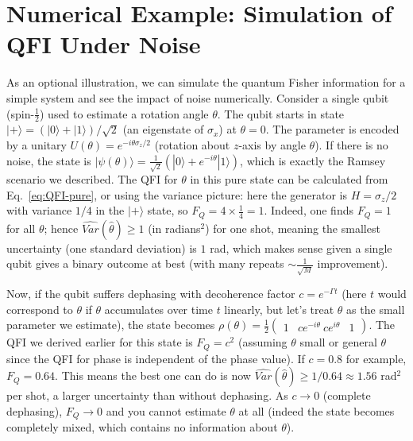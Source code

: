 \section{Numerical Example: Simulation of QFI Under Noise}

\label{sec:numerics}



As an optional illustration, we can simulate the quantum Fisher
information for a simple system and see the impact of noise
numerically. Consider a single qubit (spin-$\frac{1}{2}$) used to
estimate a rotation angle $\theta$. The qubit starts in state
$|+\rangle = (|0\rangle+|1\rangle)/\sqrt{2}$ (an eigenstate of
$\sigma_x$) at $\theta=0$. The parameter is encoded by a unitary
$U(\theta) = e^{-i \theta \sigma_z/2}$ (rotation about $z$-axis by
angle $\theta$). If there is no noise, the state is
$|\psi(\theta)\rangle = \frac{1}{\sqrt{2}}(|0\rangle +
e^{-i\theta}|1\rangle)$, which is exactly the Ramsey scenario we
described. The QFI for $\theta$ in this pure state can be calculated
from Eq.~\eqref{eq:QFI-pure}, or using the variance picture: here the
generator is $H=\sigma_z/2$ with variance $1/4$ in the $|+\rangle$
state, so $F_Q = 4 \times \frac{1}{4} = 1$. Indeed, one finds $F_Q =
1$ for all $\theta$; hence $\widehat{Var}(\hat{\theta}) \ge 1$ (in radians$^2$)
for one shot, meaning the smallest uncertainty (one standard
deviation) is $1$ rad, which makes sense given a single qubit gives a
binary outcome at best (with many repeats $\sim \frac{1}{\sqrt{M}}$
improvement).



Now, if the qubit suffers dephasing with decoherence factor $c =
e^{-\Gamma t}$ (here $t$ would correspond to $\theta$ if $\theta$
accumulates over time $t$ linearly, but let’s treat $\theta$ as the
small parameter we estimate), the state becomes $\rho(\theta) =
\frac{1}{2}\begin{pmatrix}1 & c e^{-i\theta} \ c e^{i\theta} &
  1\end{pmatrix}$. The QFI we derived earlier for this state is $F_Q =
  c^2$ (assuming $\theta$ small or general $\theta$ since the QFI for
  phase is independent of the phase value). If $c=0.8$ for example,
  $F_Q = 0.64$. This means the best one can do is now
  $\widehat{Var}(\hat{\theta}) \ge 1/0.64 \approx 1.56$ rad$^2$ per shot, a
  larger uncertainty than without dephasing. As $c \to 0$ (complete
  dephasing), $F_Q \to 0$ and you cannot estimate $\theta$ at all
  (indeed the state becomes completely mixed, which contains no
  information about $\theta$).




